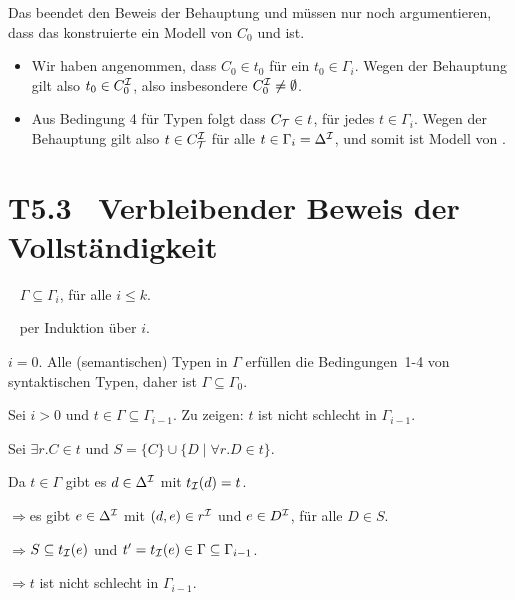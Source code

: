 \documentclass[fontsize=11pt, twoside=false, numbers=autoenddot]{scrbook}
\begin{document}
Das beendet den Beweis der Behauptung und müssen nur noch
argumentieren, dass das konstruierte \Imc ein Modell von $C_0$ und
\Tmc ist. 
%
\begin{itemize}

  \item Wir haben angenommen, dass $C_0\in t_0$ für ein
    $t_0\in\Gamma_i$. Wegen der Behauptung gilt also $t_0\in
    C_0^\mathcal{I}$, also insbesondere $C_0^\mathcal{I}\neq \emptyset$.

  \item Aus Bedingung 4 für Typen folgt dass $C_\mathcal{T}\in t$, für jedes
    $t\in \Gamma_i$. Wegen der Behauptung gilt also $t\in C_\mathcal{T}^\mathcal{I}$
    für alle $t\in \Gamma_i=\Delta^\mathcal{I}$, 
    und somit ist \Imc Modell von \Tmc.
    \qedhere

\end{itemize}

\section*{T5.3~ Verbleibender Beweis der Vollständigkeit}

~
$\Gamma\subseteq \Gamma_i$,
für alle $i\leq k$.

\parII
{}~
per Induktion über $i$.

\parI
{} $i=0$. Alle
(semantischen) Typen in $\Gamma$ erfüllen die Bedingungen~1-4 von
syntaktischen Typen, daher ist $\Gamma\subseteq \Gamma_0$.

\smallskip
{} Sei $i>0$ und $t\in \Gamma\subseteq
\Gamma_{i-1}$.  Zu zeigen: $t$ ist nicht schlecht in $\Gamma_{i-1}$. 

\smallskip

Sei $\exists r.C\in t$ und $S=\{C\}\cup\{D\mid \forall r.D\in t\}$. 

Da $t\in\Gamma$ gibt es $d\in\Delta^\mathcal{I}$ mit $t_\mathcal{I}(d)=t$. 

$\Rightarrow$\quad es gibt $e\in\Delta^\mathcal{I}$ mit $(d,e)\in r^\mathcal{I}$ und $e\in D^\mathcal{I}$, für alle $D\in S$. 

$\Rightarrow$\quad $S\subseteq t_\mathcal{I}(e)$ und
$t'=t_\mathcal{I}(e)\in \Gamma\subseteq\Gamma_{i-1}$. 

$\Rightarrow$\quad $t$ ist nicht schlecht in $\Gamma_{i-1}$.
\qedhere
\end{document}
